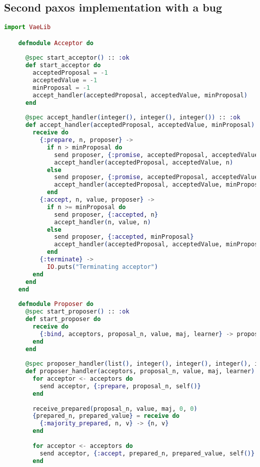 \subsection{Second paxos implementation with a bug}
\begin{lstlisting}[language=Elixir, xleftmargin=.1\linewidth]
    import VaeLib

    defmodule Acceptor do
    
      @spec start_acceptor() :: :ok
      def start_acceptor do
        acceptedProposal = -1
        acceptedValue = -1
        minProposal = -1
        accept_handler(acceptedProposal, acceptedValue, minProposal)
      end
    
      @spec accept_handler(integer(), integer(), integer()) :: :ok
      def accept_handler(acceptedProposal, acceptedValue, minProposal) do
        receive do
          {:prepare, n, proposer} ->
            if n > minProposal do
              send proposer, {:promise, acceptedProposal, acceptedValue}
              accept_handler(acceptedProposal, acceptedValue, n)
            else
              send proposer, {:promise, acceptedProposal, acceptedValue}
              accept_handler(acceptedProposal, acceptedValue, minProposal)
            end
          {:accept, n, value, proposer} ->
            if n >= minProposal do
              send proposer, {:accepted, n}
              accept_handler(n, value, n)
            else
              send proposer, {:accepted, minProposal}
              accept_handler(acceptedProposal, acceptedValue, minProposal)
            end
          {:terminate} ->
            IO.puts("Terminating acceptor")
        end
      end
    end
    
    defmodule Proposer do
      @spec start_proposer() :: :ok
      def start_proposer do
        receive do
          {:bind, acceptors, proposal_n, value, maj, learner} -> proposer_handler(acceptors, proposal_n, value, maj, learner)
        end
      end
    
      @spec proposer_handler(list(), integer(), integer(), integer(), integer()) :: :ok
      def proposer_handler(acceptors, proposal_n, value, maj, learner) do
        for acceptor <- acceptors do
          send acceptor, {:prepare, proposal_n, self()}
        end
    
        receive_prepared(proposal_n, value, maj, 0, 0)
        {prepared_n, prepared_value} = receive do
          {:majority_prepared, n, v} -> {n, v}
        end
    
        for acceptor <- acceptors do
          send acceptor, {:accept, prepared_n, prepared_value, self()}
        end
    

\end{lstlisting}
